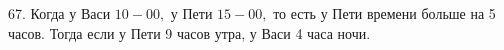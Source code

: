 67. Когда у Васи $10-00,$ у Пети $15-00,$ то есть у Пети времени больше на 5 часов. Тогда если у Пети 9 часов утра, у Васи 4 часа ночи.\\
